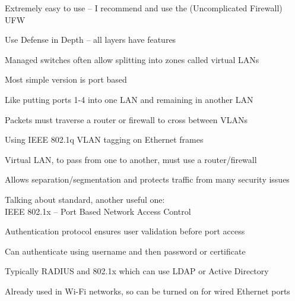 \documentclass[Screen16to9,17pt]{foils}
\begin{document}
\begin{list2}
\item Extremely easy to use -- I recommend and use the (Uncomplicated Firewall) UFW
\end{list2}





\centerline{Use Defense in Depth -- all layers have features}






\begin{list1}
\item Managed switches often allow splitting into zones called virtual LANs
\item Most simple version is port based
\item Like putting ports 1-4 into one LAN and remaining in another LAN
\item Packets must traverse a router or firewall to cross between VLANs
\end{list1}



\begin{list1}
\item Using IEEE 802.1q  VLAN tagging on Ethernet frames
\item Virtual LAN, to pass from one to another, must use a router/firewall
\item Allows separation/segmentation and protects traffic from many security issues
\end{list1}





Talking about standard, another useful one:\\
IEEE 802.1x -- Port Based Network Access Control


\begin{list1}
\item Authentication protocol ensures user validation before port access
\item Can authenticate using username and then password or certificate
\item Typically RADIUS and 802.1x which can use LDAP or Active Directory
\item Already used in Wi-Fi networks, so can be turned on for wired Ethernet ports
\end{list1}
\end{document}
